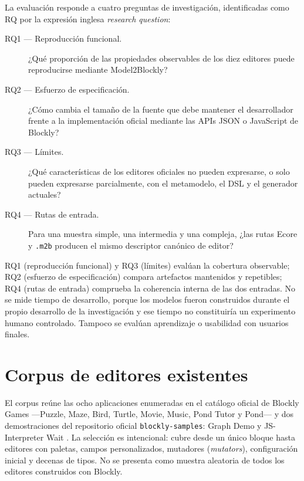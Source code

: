 La evaluación responde a cuatro preguntas de investigación, identificadas como
RQ por la expresión inglesa \emph{research question}:

\begin{description}
  \item[RQ1 --- Reproducción funcional.] ¿Qué proporción de las propiedades
  observables de los diez editores puede reproducirse mediante Model2Blockly?

  \item[RQ2 --- Esfuerzo de especificación.] ¿Cómo cambia el tamaño de la
  fuente que debe mantener el desarrollador frente a la implementación oficial
  mediante las APIs JSON o JavaScript de Blockly?

  \item[RQ3 --- Límites.] ¿Qué características de los editores oficiales no
  pueden expresarse, o solo pueden expresarse parcialmente, con el metamodelo,
  el DSL y el generador actuales?

  \item[RQ4 --- Rutas de entrada.] Para una muestra simple, una intermedia y
  una compleja, ¿las rutas Ecore y \texttt{.m2b} producen el mismo descriptor
  canónico de editor?
\end{description}

RQ1 (reproducción funcional) y RQ3 (límites) evalúan la cobertura observable;
RQ2 (esfuerzo de especificación) compara artefactos mantenidos y repetibles;
RQ4 (rutas de entrada) comprueba la coherencia interna de las dos entradas. No se mide
tiempo de desarrollo, porque los modelos fueron construidos durante el propio
desarrollo de la investigación y ese tiempo no constituiría un experimento
humano controlado. Tampoco se evalúan aprendizaje o usabilidad con usuarios
finales.

\section{Corpus de editores existentes}
\label{sec:corpus-evaluacion}

El corpus reúne las ocho aplicaciones enumeradas en el catálogo oficial de
Blockly Games ---Puzzle, Maze, Bird, Turtle, Movie, Music, Pond Tutor y Pond---
y dos demostraciones del repositorio oficial \texttt{blockly-samples}: Graph
Demo y JS-Interpreter Wait
\cite{blocklyGamesCatalogue,blocklyGamesRepository,blocklySamplesRepository}.
La selección es intencional: cubre desde un único bloque hasta editores con
paletas, campos personalizados, mutadores (\emph{mutators}), configuración inicial y decenas de
tipos. No se presenta como muestra aleatoria de todos los editores construidos
con Blockly.

